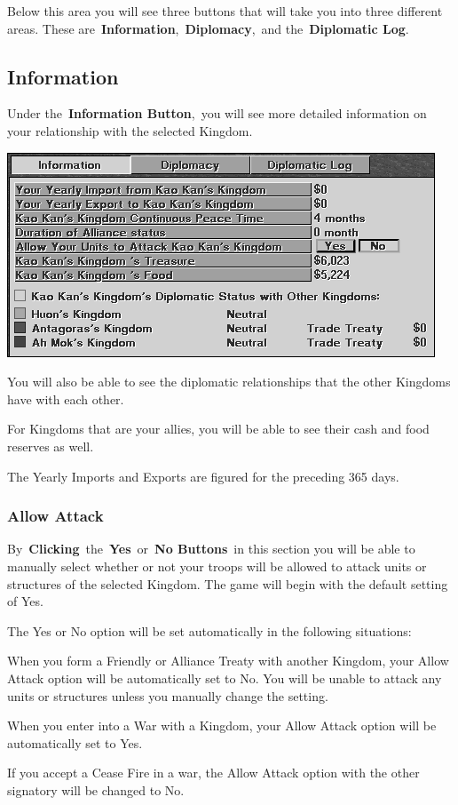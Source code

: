 Below this area you will see three buttons that will take you into three different areas. These are \textbf{Information}, \textbf{Diplomacy}, and the \textbf{Diplomatic Log}.

\subsection{Information}

Under the \textbf{Information Button}, you will see more detailed information on your relationship with the selected Kingdom.

\begin{center}
	\includegraphics[width=0.7\linewidth]{Ikingdoms_information}
\end{center}

You will also be able to see the diplomatic relationships that the other Kingdoms have with each other.

For Kingdoms that are your allies, you will be able to see their cash and food reserves as well.

The Yearly Imports and Exports are figured for the preceding 365 days.

\subsubsection{Allow Attack}

 By \textbf{Clicking} the \textbf{Yes} or \textbf{No Buttons} in this section you will be able to manually select whether or not your troops will be allowed to attack units or structures of the selected Kingdom. The game will begin with the default setting of Yes.

The Yes or No option will be set automatically in the following situations:

\begin{adjustwidth}{1cm}{}
	
When you form a Friendly or Alliance Treaty with another Kingdom, your  Allow Attack option will be automatically set to No. You will be unable to attack any units or structures unless you manually change the setting.

When you enter into a War with a Kingdom, your Allow Attack option will be automatically set to Yes.

If you accept a Cease Fire in a war, the Allow Attack option with the other signatory will be  changed to No.
\end{adjustwidth}

